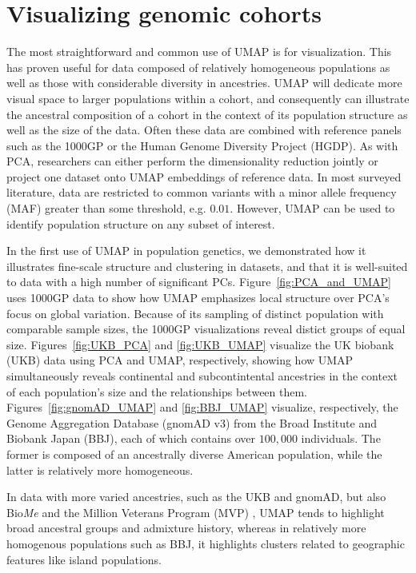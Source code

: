 \documentclass[12pt]{article}
\begin{document}
\section*{Visualizing genomic cohorts}

The most straightforward and common use of UMAP is for visualization. This has proven useful for data composed of relatively homogeneous populations as well as those with considerable diversity in ancestries. UMAP will dedicate more visual space to larger populations within a cohort, and consequently can illustrate the ancestral composition of a cohort in the context of its population structure as well as the size of the data. Often these data are combined with reference panels such as the 1000GP or the Human Genome Diversity Project (HGDP)\cite{cann2002human}.  As with PCA, researchers can either perform the dimensionality reduction jointly or project one dataset onto UMAP embeddings of reference data. In most surveyed literature, data are restricted to common variants with a minor allele frequency (MAF) greater than some threshold, e.g. $0.01$. However, UMAP can be used to identify population structure on any subset of interest.

In the first use of UMAP in population genetics, we demonstrated how it illustrates fine-scale structure and clustering in datasets, and that it is well-suited to data with a high number of significant PCs\cite{diaz-papkovich_umap_2019}.  Figure~\ref{fig:PCA_and_UMAP} uses 1000GP data to show how UMAP emphasizes local structure over PCA's focus on global variation. Because of its sampling of distinct population with comparable sample sizes, the 1000GP visualizations reveal distict groups of equal size. Figures~\ref{fig:UKB_PCA} and \ref{fig:UKB_UMAP} visualize the UK biobank (UKB)\cite{sudlow2015uk} data using PCA and UMAP, respectively, showing how UMAP simultaneously reveals continental and subcontintental ancestries in the context of each population's size and the relationships between them. Figures~\ref{fig:gnomAD_UMAP} and \ref{fig:BBJ_UMAP} visualize, respectively, the Genome Aggregation Database (gnomAD v3) from the Broad Institute\cite{karczewski_mutational_2020} and Biobank Japan (BBJ)\cite{nagai2017overview}\cite{sakaue_dimensionality_2020}, each of which contains over $100,000$ individuals. The former is composed of an ancestrally diverse American population, while the latter is relatively more homogeneous.

In data with more varied ancestries, such as the UKB and gnomAD, but also Bio\textit{Me}\cite{belbin_towards_2019} and the Million Veterans Program (MVP) \cite{hunter-zinck_genotyping_2020}, UMAP tends to highlight broad ancestral groups and admixture history, whereas in relatively more homogenous populations such as BBJ, it highlights clusters related to geographic features like island populations. 
\end{document}
